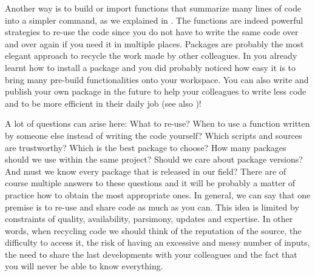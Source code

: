 Another way is to build or import functions that summarize many lines of code into a simpler command, as we explained in . The functions are indeed powerful strategies to re-use the code since you do not have to write the same code over and over again if you need it in multiple places. Packages are probably the most elegant approach to recycle the work made by other colleagues. In  you already learnt how to install a package and you did probably noticed how easy it is to bring many pre-build functionalities onto your workspace. You can also write and publish your own package in the future to help your colleagues to write less code and to be more efficient in their daily job (see also )!

A lot of questions can arise here: What to re-use? When to use a function written by someone else instead of writing the code yourself? Which scripts and sources are trustworthy? Which is the best package to choose? How many packages should we use within the same project? Should we care about package versions? And must we know every package that is released in our field? There are of course multiple answers to these questions and it will be probably a matter of practice how to obtain the most appropriate ones. In general, we can say that one premise is to re-use and share code as much as you can. This idea is limited by constraints of quality, availability, parsimony, updates and expertise. In other words, when recycling code we should think of the reputation of the source, the difficulty to access it, the risk of having an excessive and messy number of inputs, the need to share the last developments with your colleagues and the fact that you will never be able to know everything.

